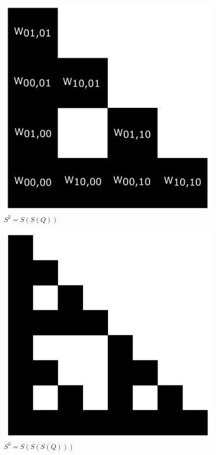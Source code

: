 \documentclass{beamer}
\begin{document}
\begin{frame}
    \begin{figure}
        \centering
        \includegraphics[scale=0.5]{2.pdf}
        \caption{$S^2 = S(S(Q))$}
    \end{figure}
\end{frame}

\begin{frame}
    \begin{figure}
        \centering
        \includegraphics[scale=0.5]{3.pdf}
        \caption{$S^3 = S(S(S(Q)))$}
    \end{figure}
\end{frame}
\end{document}
